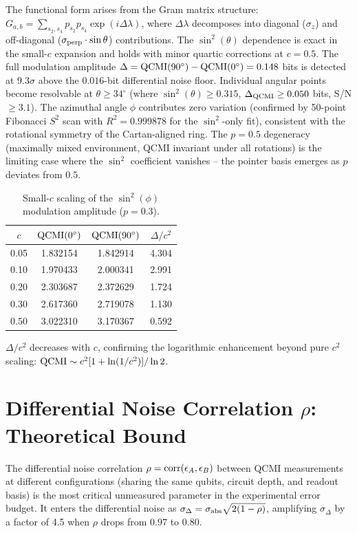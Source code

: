\documentclass[aps,prl,superscriptaddress,nofootinbib]{revtex4-2}
\begin{document}
The functional form arises from the Gram matrix structure: $G_{a,b} = \sum_{s_2,s_4} p_{s_2} p_{s_4} \exp(i\Delta\lambda)$, where $\Delta\lambda$ decomposes into diagonal ($\sigma_z$) and off-diagonal ($\sigma_{\rm perp}\cdot\sin\theta$) contributions. The $\sin^2(\theta)$ dependence is exact in the small-$c$ expansion and holds with minor quartic corrections at $c=0.5$. The full modulation amplitude $\Delta = {\rm QCMI}(90^\circ) - {\rm QCMI}(0^\circ) = 0.148$ bits is detected at $9.3\sigma$ above the $0.016$-bit differential noise floor. Individual angular points become resolvable at $\theta \geq 34^\circ$ (where $\sin^2(\theta) \geq 0.315$, $\Delta_{\rm QCMI} \geq 0.050$ bits, S/N $\geq 3.1$). The azimuthal angle $\phi$ contributes zero variation (confirmed by 50-point Fibonacci $S^2$ scan with $R^2=0.999878$ for the $\sin^2$-only fit), consistent with the rotational symmetry of the Cartan-aligned ring. The $p=0.5$ degeneracy (maximally mixed environment, QCMI invariant under all rotations) is the limiting case where the $\sin^2$ coefficient vanishes -- the pointer basis emerges as $p$ deviates from $0.5$.

\begin{table}[h]
\caption{Small-$c$ scaling of the $\sin^2(\phi)$ modulation amplitude ($p=0.3$).}
\label{tab:sin2scaling}
\begin{ruledtabular}
\begin{tabular}{cccc}
$c$ & ${\rm QCMI}(0^\circ)$ & ${\rm QCMI}(90^\circ)$ & $\Delta/c^2$ \\
\hline
0.05 & 1.832154 & 1.842914 & 4.304 \\
0.10 & 1.970433 & 2.000341 & 2.991 \\
0.20 & 2.303687 & 2.372629 & 1.724 \\
0.30 & 2.617360 & 2.719078 & 1.130 \\
0.50 & 3.022310 & 3.170367 & 0.592 \\
\end{tabular}
\end{ruledtabular}
$\Delta/c^2$ decreases with $c$, confirming the logarithmic enhancement beyond pure $c^2$ scaling: ${\rm QCMI} \sim c^2[1+\ln(1/c^2)]/\ln 2$.
\end{table}


\section{Differential Noise Correlation $\rho$: Theoretical Bound}

The differential noise correlation $\rho = {\rm corr}(\epsilon_A, \epsilon_B)$ between QCMI measurements at different configurations (sharing the same qubits, circuit depth, and readout basis) is the most critical unmeasured parameter in the experimental error budget. It enters the differential noise as $\sigma_\Delta = \sigma_{\rm abs}\sqrt{2(1-\rho)}$, amplifying $\sigma_\Delta$ by a factor of 4.5 when $\rho$ drops from $0.97$ to $0.80$.
\end{document}
